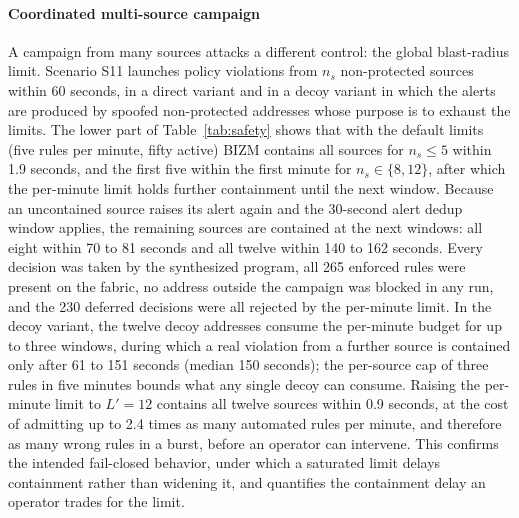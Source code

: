 \documentclass[final,5p]{elsarticle}
\begin{document}
\paragraph{Coordinated multi-source campaign}
A campaign from many sources attacks a different control: the global blast-radius limit. Scenario S11 launches policy violations from $n_s$ non-protected sources within 60 seconds, in a direct variant and in a decoy variant in which the alerts are produced by spoofed non-protected addresses whose purpose is to exhaust the limits. The lower part of Table~\ref{tab:safety} shows that with the default limits (five rules per minute, fifty active) BIZM contains all sources for $n_s\le 5$ within 1.9 seconds, and the first five within the first minute for $n_s\in\{8,12\}$, after which the per-minute limit holds further containment until the next window. Because an uncontained source raises its alert again and the 30-second alert dedup window applies, the remaining sources are contained at the next windows: all eight within 70 to 81 seconds and all twelve within 140 to 162 seconds. Every decision was taken by the synthesized program, all 265 enforced rules were present on the fabric, no address outside the campaign was blocked in any run, and the 230 deferred decisions were all rejected by the per-minute limit. In the decoy variant, the twelve decoy addresses consume the per-minute budget for up to three windows, during which a real violation from a further source is contained only after 61 to 151 seconds (median 150 seconds); the per-source cap of three rules in five minutes bounds what any single decoy can consume. Raising the per-minute limit to $L'=12$ contains all twelve sources within 0.9 seconds, at the cost of admitting up to 2.4 times as many automated rules per minute, and therefore as many wrong rules in a burst, before an operator can intervene. This confirms the intended fail-closed behavior, under which a saturated limit delays containment rather than widening it, and quantifies the containment delay an operator trades for the limit.
\end{document}

